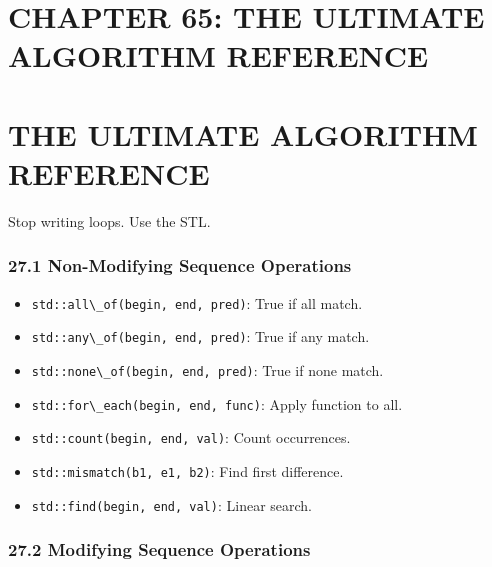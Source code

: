 \hypertarget{chapter-65-the-ultimate-algorithm-reference}{%
\section{CHAPTER 65: THE ULTIMATE ALGORITHM
REFERENCE}\label{chapter-65-the-ultimate-algorithm-reference}}

\hypertarget{the-ultimate-algorithm-reference}{%
\section{THE ULTIMATE ALGORITHM
REFERENCE}\label{the-ultimate-algorithm-reference}}

Stop writing loops. Use the STL.

\hypertarget{non-modifying-sequence-operations}{%
\subsubsection{27.1 Non-Modifying Sequence
Operations}\label{non-modifying-sequence-operations}}

\begin{itemize}
\tightlist
\item
  \passthrough{\lstinline!std::all\_of(begin, end, pred)!}: True if all
  match.
\item
  \passthrough{\lstinline!std::any\_of(begin, end, pred)!}: True if any
  match.
\item
  \passthrough{\lstinline!std::none\_of(begin, end, pred)!}: True if
  none match.
\item
  \passthrough{\lstinline!std::for\_each(begin, end, func)!}: Apply
  function to all.
\item
  \passthrough{\lstinline!std::count(begin, end, val)!}: Count
  occurrences.
\item
  \passthrough{\lstinline!std::mismatch(b1, e1, b2)!}: Find first
  difference.
\item
  \passthrough{\lstinline!std::find(begin, end, val)!}: Linear search.
\end{itemize}

\hypertarget{modifying-sequence-operations}{%
\subsubsection{27.2 Modifying Sequence
Operations}\label{modifying-sequence-operations}}

